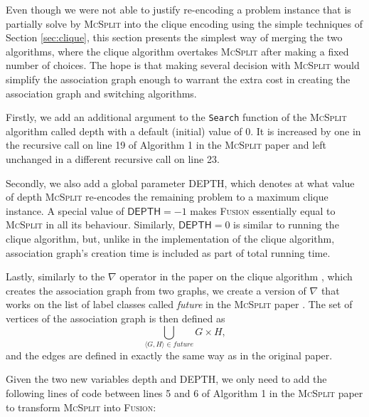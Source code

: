 \documentclass{l4proj}
\theoremstyle{definition}
\theoremstyle{remark}
\begin{document}
Even though we were not able to justify re-encoding a problem instance that is
partially solve by \textsc{McSplit} into the clique encoding using the simple
techniques of Section \ref{sec:clique}, this section presents the simplest way of
merging the two algorithms, where the clique algorithm overtakes
\textsc{McSplit} after making a fixed number of choices. The hope is that making
several decision with \textsc{McSplit} would simplify the association graph
enough to warrant the extra cost in creating the association graph and switching
algorithms.

Firstly, we add an additional argument to the \texttt{Search} function of the
\textsc{McSplit} algorithm \cite{DBLP:conf/ijcai/McCreeshPT17} called
\textsf{depth} with a default (initial) value of 0. It is increased by one in
the recursive call on line 19 of Algorithm 1 in the \textsc{McSplit} paper
\cite{DBLP:conf/ijcai/McCreeshPT17} and left unchanged in a different recursive
call on line 23.

Secondly, we also add a global parameter \textsf{DEPTH}, which denotes at what value of
\textsf{depth} \textsc{McSplit} re-encodes the remaining problem to a maximum
clique instance. A special value of $\textsf{DEPTH} = -1$ makes \textsc{Fusion}
essentially equal to \textsc{McSplit} in all its behaviour. Similarly,
$\textsf{DEPTH} = 0$ is similar to running the clique algorithm, but, unlike in
the implementation of the clique algorithm, association graph's creation time is
included as part of total running time.

Lastly, similarly to the $\nabla$ operator in the paper on the clique
algorithm \cite{DBLP:conf/cp/McCreeshNPS16}, which creates the association graph
from two graphs, we create a version of $\nabla$ that works on the list of label
classes called \textit{future} in the \textsc{McSplit} paper
\cite{DBLP:conf/ijcai/McCreeshPT17}. The set of vertices of the association
graph is then defined as
\[ \bigcup_{\langle G, H \rangle \in \textit{future}} G \times H, \]
and the edges are defined in exactly the same way as in the original paper.

Given the two new variables \textsf{depth} and \textsf{DEPTH}, we only need to
add the following lines of code between lines 5 and 6 of Algorithm 1 in the
\textsc{McSplit} paper \cite{DBLP:conf/ijcai/McCreeshPT17} to transform
\textsc{McSplit} into \textsc{Fusion}:

\begin{algorithm}
\end{algorithm}
\end{document}
